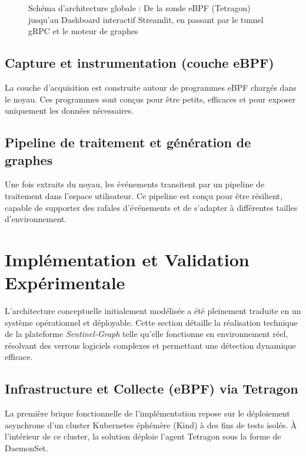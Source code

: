 \documentclass[a4paper,12pt]{article}
\begin{document}
\begin{figure}[htbp]
\centering
\fbox{\rule{0pt}{3in} \rule{0.9\linewidth}{0pt}}
\caption{Schéma d'architecture globale : De la sonde eBPF (Tetragon) jusqu'au Dashboard interactif Streamlit, en passant par le tunnel gRPC et le moteur de graphes}
\label{fig:architecture}
\end{figure}

\subsection{Capture et instrumentation (couche eBPF)}

La couche d'acquisition est construite autour de programmes eBPF chargés dans le noyau. Ces programmes sont conçus pour être petits, efficaces et pour exposer uniquement les données nécessaires.

\subsection{Pipeline de traitement et génération de graphes}

Une fois extraits du noyau, les événements transitent par un pipeline de traitement dans l'espace utilisateur. Ce pipeline est conçu pour être résilient, capable de supporter des rafales d'événements et de s'adapter à différentes tailles d'environnement.


\section{Implémentation et Validation Expérimentale}

L'architecture conceptuelle initialement modélisée a été pleinement traduite en un système opérationnel et déployable. Cette section détaille la réalisation technique de la plateforme \textit{Sentinel-Graph} telle qu'elle fonctionne en environnement réel, résolvant des verrous logiciels complexes et permettant une détection dynamique efficace.

\subsection{Infrastructure et Collecte (eBPF) via Tetragon}

La première brique fonctionnelle de l'implémentation repose sur le déploiement asynchrone d'un cluster Kubernetes éphémère (Kind) à des fins de tests isolés. À l'intérieur de ce cluster, la solution déploie l'agent Tetragon sous la forme de DaemonSet. 
\end{document}
